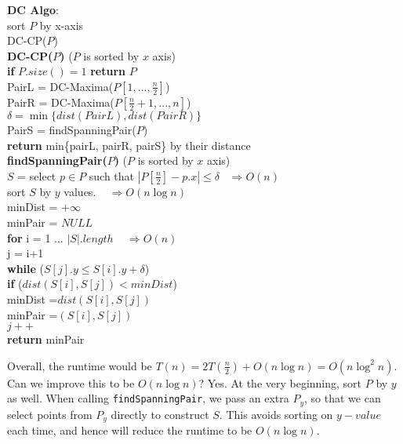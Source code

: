 \documentclass[twoside]{article}
\newcommand{\pc}[1]{\mbox{\textbf{#1}}} %
\begin{document}
\begin{algorithme}
	\textbf{DC Algo}: \\
	\> sort $P$ by x-axis\\
	\> DC-CP($P$)\\
	\textbf{DC-CP($P$)} ($P$ is sorted by $x$ axis)\\
	\>\pc{if} $P.size() = 1$ \pc{return} $P$\\ 
	\> PairL = DC-Maxima($P[1, ..., \frac{n}{2}]$)\\
	\> PairR = DC-Maxima($P[\frac{n}{2}+1, ..., n]$)\\
	\> $\delta = \min \{dist(PairL), dist(PairR)\}$\\
	\> PairS = findSpanningPair($P$)\\
	\> \pc{return} min\{pairL, pairR, pairS\} by their distance\\
	\textbf{findSpanningPair($P$)} ($P$ is sorted by $x$ axis)\\
	\> $S$ = select $p \in P$ such that $|P[\frac{n}{2}] - p.x| \leq \delta$$\;\;\; \Rightarrow O(n)$\\
	\> sort $S$ by $y$ values. $\;\;\; \Rightarrow O(n\log n)$\\
	\> minDist = $+\infty$\\
	\> minPair = $NULL$\\
	\> \pc{for} i = 1 ... $|S|.length$ $\;\;\; \Rightarrow O(n)$\\
	\> \> j = i+1\\
	\>\>\pc{while} ($S[j].y \leq S[i].y+\delta$)\\
	\>\>\>\pc{if} ($dist(S[i], S[j]) < minDist$)\\
	\>\>\>\>minDist =$dist(S[i], S[j])$\\ 
	\>\>\>\>minPair =$(S[i], S[j])$\\ 
	\>\>\>$j++$\\
	\>\pc{return} minPair\\ 
\end{algorithme}
Overall, the runtime would be $T(n) = 2T(\frac{n}{2}) + O(n\log n) = O(n\log^2 n)$. Can we improve this to be $O(n\log n)$? Yes. At the very beginning, sort $P$ by $y$ as well. When calling \texttt{findSpanningPair}, we pass an extra $P_y$, so that we can select points from $P_y$ directly to construct $S$. This avoids sorting on $y-value$ each time, and hence will reduce the runtime to be $O(n\log n)$. 
\end{document}
